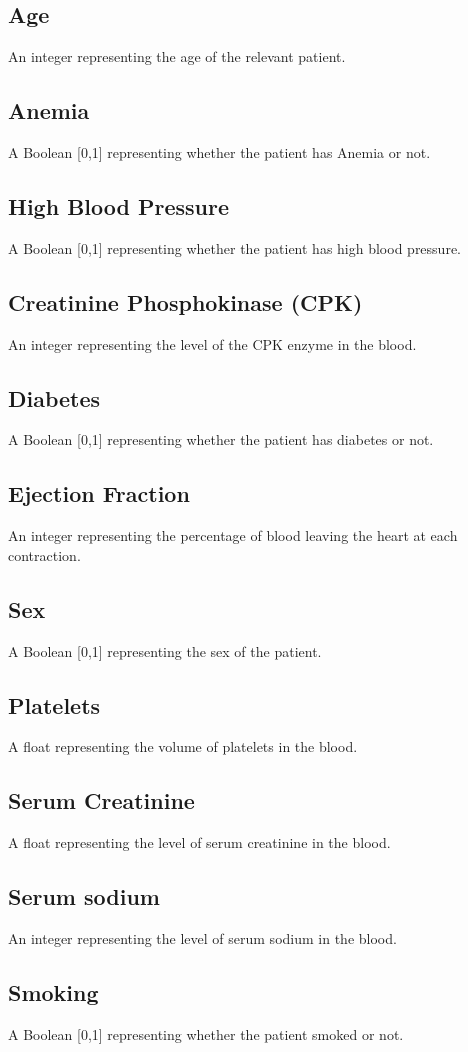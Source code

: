 \documentclass[conference]{IEEEtran}
\begin{document}
\subsection{Age}
An integer representing the age of the relevant patient.
\subsection{Anemia}
A Boolean [0,1] representing whether the patient has Anemia or not.
\subsection{High Blood Pressure}
A Boolean [0,1] representing whether the patient has high blood pressure.
\subsection{Creatinine Phosphokinase (CPK)}
An integer representing the level of the CPK enzyme in the blood.
\subsection{Diabetes}
A Boolean [0,1] representing whether the patient has diabetes or not.
\subsection{Ejection Fraction}
An integer representing the percentage of blood leaving the heart at each contraction.
\subsection{Sex}
A Boolean [0,1] representing the sex of the patient.
\subsection{Platelets}
A float representing the volume of platelets in the blood.
\subsection{Serum Creatinine}
A float representing the level of serum creatinine in the blood.
\subsection{Serum sodium}
An integer representing the level of serum sodium in the blood.
\subsection{Smoking}
A Boolean [0,1] representing whether the patient smoked or not.
\end{document}
